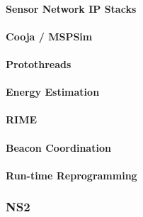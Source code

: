 \paragraph{Sensor Network IP Stacks}
\cite{ko2011beyond} %
\cite{dunkels2009efficient} %
\cite{Durvy:2008:MSN:1460412.1460483} %
\cite{dunkels2003full} %

\paragraph{Cooja / MSPSim}
\cite{Eriksson:2009:CIT:1537614.1537650} %

\paragraph{Protothreads}
\cite{Dunkels:2006:PSE:1182807.1182811} %

\paragraph{Energy Estimation}
\cite{Dunkels:2007:SOE:1278972.1278979} %

\paragraph{RIME}
\cite{Dunkels:2007:ACA:1322263.1322295} %

\paragraph{Beacon Coordination}
\cite{Dunkels:2011:ALB:1966251.1966270} %

\paragraph{Run-time Reprogramming}
\cite{Dunkels:2006:RDL:1182807.1182810} %

\subsubsection*{NS2}

